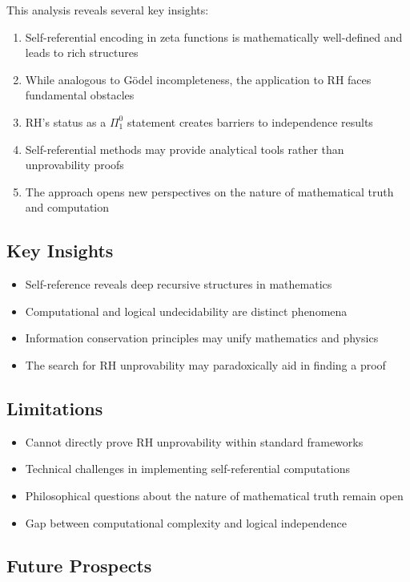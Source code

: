 \documentclass[12pt]{article}
\theoremstyle{plain}
\theoremstyle{definition}
\begin{document}
This analysis reveals several key insights:

\begin{enumerate}
\item Self-referential encoding in zeta functions is mathematically well-defined and leads to rich structures
\item While analogous to Gödel incompleteness, the application to RH faces fundamental obstacles
\item RH's status as a $\Pi_1^0$ statement creates barriers to independence results
\item Self-referential methods may provide analytical tools rather than unprovability proofs
\item The approach opens new perspectives on the nature of mathematical truth and computation
\end{enumerate}

\subsection{Key Insights}

\begin{itemize}
\item Self-reference reveals deep recursive structures in mathematics
\item Computational and logical undecidability are distinct phenomena
\item Information conservation principles may unify mathematics and physics
\item The search for RH unprovability may paradoxically aid in finding a proof
\end{itemize}

\subsection{Limitations}

\begin{itemize}
\item Cannot directly prove RH unprovability within standard frameworks
\item Technical challenges in implementing self-referential computations
\item Philosophical questions about the nature of mathematical truth remain open
\item Gap between computational complexity and logical independence
\end{itemize}

\subsection{Future Prospects}
\end{document}
